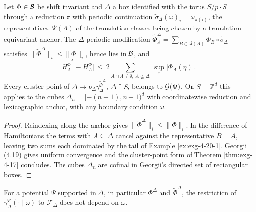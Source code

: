 \begin{example}
    \label{ex:exg-4-20-2}
    \leanok

    Let $\Phi\in\mathcal{B}$ be shift invariant and $\Delta$ a box identified with the torus
    $S/p\!\cdot\!S$ through a reduction $\pi$ with periodic continuation
    $\tilde\sigma_\Delta(\omega)_i=\omega_{\pi(i)}$, the representatives $\mathcal R(A)$ of
    the translation classes being chosen by a translation-equivariant anchor. The
    $\Delta$-periodic modification
    $\tilde\Phi^\Delta_A=\sum_{B\in\mathcal R(A)}\Phi_B\circ\tilde\sigma_\Delta$ satisfies
    $\|\tilde\Phi^\Delta\|_i\le\|\Phi\|_i$, hence lies in $\mathcal{B}$, and
    \[\big|H^{\tilde\Phi^\Delta}_\Lambda-H^\Phi_\Lambda\big|\ \le\ 2
      \sum_{A\cap\Lambda\neq\emptyset,\ A\not\subseteq\Delta}\ \sup_\eta|\Phi_A(\eta)| .\]
    Every cluster point of $\Delta\mapsto\nu_\Delta\gamma^{\tilde\Phi^\Delta}_\Delta$,
    $\Delta\uparrow S$, belongs to $\mathcal{G}(\Phi)$. On $S=\mathbb Z^d$ this applies to the
    cubes $\Delta_n=[-(n+1),n+1)^d$ with coordinatewise reduction and lexicographic anchor,
    with any boundary condition $\omega$.
\end{example}
\begin{proof}
    \leanok

    Reindexing along the anchor gives $\|\tilde\Phi^\Delta\|_i\le\|\Phi\|_i$. In the
    difference of Hamiltonians the terms with $A\subseteq\Delta$ cancel against the
    representative $B=A$, leaving two sums each dominated by the tail of
    Example \ref{ex:exg-4-20-1}. Georgii (4.19) gives uniform convergence and the
    cluster-point form of Theorem \ref{thm:exg-4-17} concludes. The cubes $\Delta_n$ are
    cofinal in Georgii's directed set of rectangular boxes.
\end{proof}

\begin{remark}
    \label{rmk:exg-4-20-supported}
    \leanok

    For a potential $\Psi$ supported in $\Delta$, in particular $\Phi^\Delta$ and
    $\tilde\Phi^\Delta$, the restriction of $\gamma^\Psi_\Delta(\cdot\mid\omega)$ to
    $\mathcal F_\Delta$ does not depend on $\omega$.
\end{remark}

